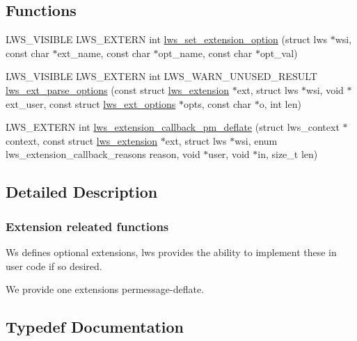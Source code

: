 \subsection*{Functions}
\begin{DoxyCompactItemize}
\item 
L\+W\+S\+\_\+\+V\+I\+S\+I\+B\+LE L\+W\+S\+\_\+\+E\+X\+T\+E\+RN int \hyperlink{group__extensions_gae0e24e1768f83a7fb07896ce975704b9}{lws\+\_\+set\+\_\+extension\+\_\+option} (struct lws $\ast$wsi, const char $\ast$ext\+\_\+name, const char $\ast$opt\+\_\+name, const char $\ast$opt\+\_\+val)
\item 
L\+W\+S\+\_\+\+V\+I\+S\+I\+B\+LE L\+W\+S\+\_\+\+E\+X\+T\+E\+RN int L\+W\+S\+\_\+\+W\+A\+R\+N\+\_\+\+U\+N\+U\+S\+E\+D\+\_\+\+R\+E\+S\+U\+LT \hyperlink{group__extensions_ga6fb3e2c3dfb9d64dc87026a4e99c128b}{lws\+\_\+ext\+\_\+parse\+\_\+options} (const struct \hyperlink{structlws__extension}{lws\+\_\+extension} $\ast$ext, struct lws $\ast$wsi, void $\ast$ext\+\_\+user, const struct \hyperlink{structlws__ext__options}{lws\+\_\+ext\+\_\+options} $\ast$opts, const char $\ast$o, int len)
\item 
L\+W\+S\+\_\+\+E\+X\+T\+E\+RN int \hyperlink{group__extensions_ga4cdbe42d872e21a448a947714d6c607e}{lws\+\_\+extension\+\_\+callback\+\_\+pm\+\_\+deflate} (struct lws\+\_\+context $\ast$context, const struct \hyperlink{structlws__extension}{lws\+\_\+extension} $\ast$ext, struct lws $\ast$wsi, enum lws\+\_\+extension\+\_\+callback\+\_\+reasons reason, void $\ast$user, void $\ast$in, size\+\_\+t len)
\end{DoxyCompactItemize}


\subsection{Detailed Description}
\subsubsection*{Extension releated functions}

Ws defines optional extensions, lws provides the ability to implement these in user code if so desired.

We provide one extensions permessage-\/deflate. 

\subsection{Typedef Documentation}
